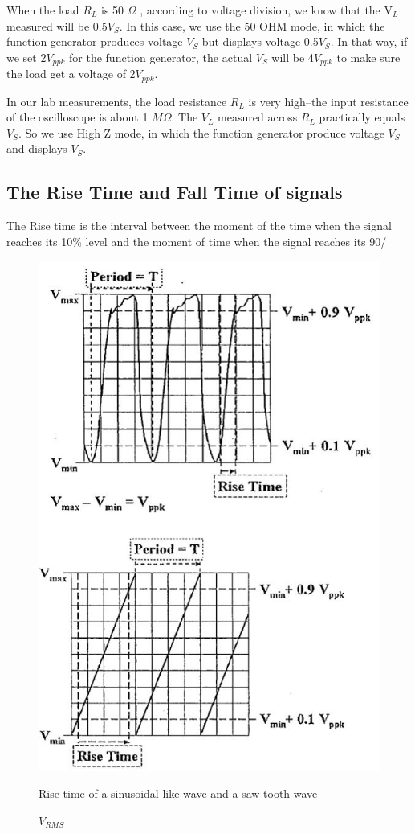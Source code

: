 \documentclass{article}
\begin{document}
When the load $R_L$ is 50 $\Omega$ , according to voltage division, we know that the V$_L$ measured will be 0.5$V_S$. In this case, we use the 50 OHM mode, in which the function generator produces voltage $V_S$ but displays voltage 0.5$V_S$. In that way, if we set 2$V_{ppk}$ for the function generator, the actual $V_S$ will be 4$V_{ppk}$ to make sure the load get a voltage of 2$V_{ppk}$.

In our lab measurements, the load resistance $R_L$ is very high--the input resistance of the oscilloscope is about 1 $M\Omega$. The $V_L$ measured across $R_L$ practically equals $V_S$. So we use High Z mode, in which the function generator produce voltage $V_S$ and displays $V_S$.

\subsection{The Rise Time and Fall Time of signals}

The Rise time is the interval between the moment of the time when the signal reaches its 10\% level and the moment of time when the signal reaches its 90/%

  \begin{figure}[H]
  \centering
  \includegraphics[width=.6\textwidth]{Figure2.jpg}
  \caption{Rise time of a sinusoidal like wave and a saw-tooth wave}
  \caption{$V_{RMS}$}
  \label{img} 
\end{figure}
\end{document}

